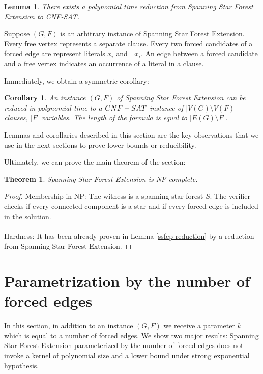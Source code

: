 \documentclass[en]{pracamgr}
\newtheorem{theorem}{Theorem}
\newtheorem{lemma}{Lemma}
\newtheorem{corollary}{Corollary}
\newenvironment{sproof}{%
	\renewcommand{\proofname}{Proof (sketch).}\proof}{\endproof}
\newcommand{\ssfep}{{\sc Spanning Star Forest Extension}}
\newcommand{\cnfsat}{{\sc CNF-SAT}}
\begin{document}
\begin{lemma}\label{cnfsat reduction}
	There exists a polynomial time reduction from \ssfep{} to \cnfsat{}.
\end{lemma}

\begin{sproof}
	Suppose $(G,F)$ is an arbitrary instance of \ssfep{}. Every free vertex represents a separate clause. Every two forced candidates of a forced edge are represent literals $x_i$ and $\neg x_i$. An edge between a forced candidate and a free vertex indicates an occurrence of a literal in a clause.
\end{sproof}

Immediately, we obtain a symmetric corollary:

\begin{corollary}\label{reduction size}
	An instance $(G,F)$ of \ssfep{} can be reduced in polynomial time to a $\cnfsat{}$ instance of $|V(G) \setminus V(F)|$ clauses, $|F|$ variables. The length of the formula is equal to $|E(G) \setminus F|$.
\end{corollary}

Lemmas and corollaries described in this section are the key observations that we use in the next sections to prove lower bounds or reducibility.

Ultimately, we can prove the main theorem of the section:
\begin{theorem}
	\ssfep{} is NP-complete.
\end{theorem}

\begin{proof}
	Membership in NP: The witness is a spanning star forest $S$. The verifier checks if every connected component is a star and if every forced edge is included in the solution.
	\\\\
	Hardness: It has been already proven in Lemma \ref{ssfep reduction} by a reduction from \ssfep{}.
\end{proof}

\section{Parametrization by the number of forced edges}

In this section, in addition to an instance $(G,F)$ we receive a parameter $k$ which is equal to a number of forced edges. We show two major results: \ssfep{} parameterized by the number of forced edges does not invoke a kernel of polynomial size and a lower bound under strong exponential hypothesis.
\end{document}

